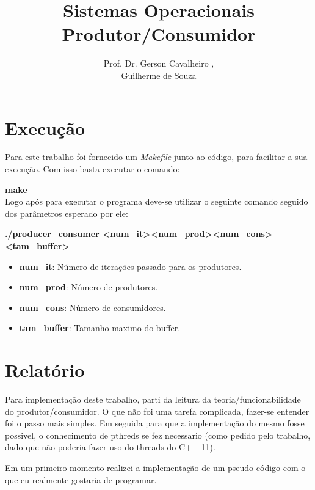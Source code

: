 \documentclass[12pt]{article}
\title{Sistemas Operacionais\\Produtor/Consumidor}
\author{Prof. Dr. Gerson Cavalheiro \inst{1},\\Guilherme de Souza\inst{1}}
\begin{document}
 

\maketitle
\br
\section{Execução}
Para este trabalho foi fornecido um \textit{Makefile} junto ao código, para facilitar a sua execução. Com isso basta executar o comando:

\textbf{make}\\
Logo após para executar o programa deve-se utilizar o seguinte comando seguido dos parâmetros esperado por ele:

\textbf{./producer\_consumer <num\_it><num\_prod><num\_cons><tam\_buffer>}
\begin{itemize}
    \item\textbf{num\_it}: Número de iterações passado para os produtores.
    \item\textbf{num\_prod}: Número de produtores.
    \item\textbf{num\_cons}: Número de consumidores.
    \item\textbf{tam\_buffer}: Tamanho maximo do buffer.
\end{itemize}

\section{Relatório}

Para implementação deste trabalho, parti da leitura da teoria/funcionabilidade do produtor/consumidor. O que não foi uma tarefa complicada, fazer-se entender foi o passo mais simples. Em seguida para que a implementação do mesmo fosse possivel, o conhecimento de pthreds se fez necessario (como pedido pelo trabalho, dado que não poderia fazer uso do threads do C++ 11).

Em um primeiro momento realizei a implementação de um pseudo código com o que eu realmente gostaria de programar.

\end{document}
